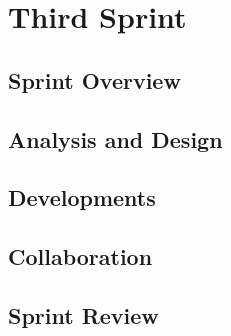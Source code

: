 \chapter{Third Sprint}

\section{Sprint Overview}


\section{Analysis and Design}

\section{Developments}

\section{Collaboration}

\section{Sprint Review}
